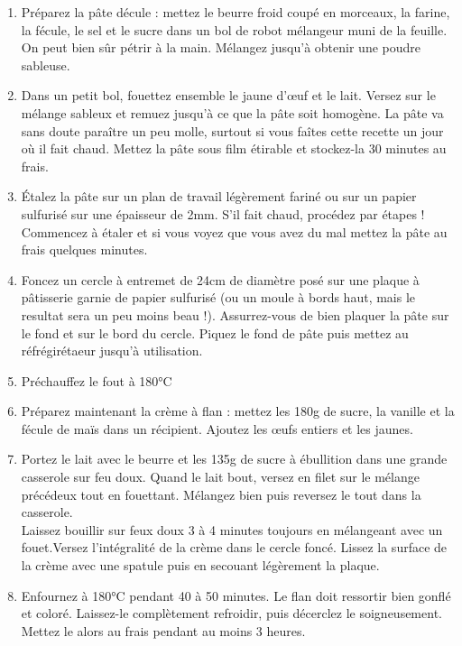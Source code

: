 {\begin{enumerate}
\item Préparez la pâte décule : mettez le beurre froid coupé en morceaux, la farine, la fécule, le sel et le sucre dans un bol de robot mélangeur muni de la feuille. On peut bien sûr pétrir à la main. Mélangez jusqu'à obtenir une poudre sableuse.
\item Dans un petit bol, fouettez ensemble le jaune d'\oe uf et le lait. Versez sur le mélange sableux et remuez jusqu'à ce que la pâte soit homogène. La pâte va sans doute paraître un peu molle, surtout si vous faîtes cette recette un jour où il fait chaud. Mettez la pâte sous film étirable et stockez-la 30 minutes au frais.
\item Étalez la pâte sur un plan de travail légèrement fariné ou sur un papier sulfurisé sur une épaisseur de 2mm. S'il fait chaud, procédez par étapes ! Commencez à étaler et si vous voyez que vous avez du mal mettez la pâte au frais quelques minutes.
\item Foncez un cercle à entremet de 24cm de diamètre posé sur une plaque à pâtisserie garnie de papier sulfurisé (ou un moule à bords haut, mais le resultat sera un peu moins beau !). Assurrez-vous de bien plaquer la pâte sur le fond et sur le bord du cercle. Piquez le fond de pâte puis mettez au réfrégirétaeur jusqu'à utilisation.
\item Préchauffez le fout à 180°C
\item Préparez maintenant la crème à flan : mettez les 180g de sucre, la vanille et la fécule de maïs dans un récipient. Ajoutez les \oe ufs entiers et les jaunes. 
\item Portez le lait avec le beurre et les 135g de sucre à ébullition dans une grande casserole sur feu doux. Quand le lait bout, versez en filet sur le mélange précédeux tout en fouettant. Mélangez bien puis reversez le tout dans la casserole.
\\ Laissez bouillir sur feux doux 3 à 4 minutes toujours en mélangeant avec un fouet.Versez l'intégralité de la crème dans le cercle foncé. Lissez la surface de la crème avec une spatule puis en secouant légèrement la plaque.
\item Enfournez à 180°C pendant 40 à 50 minutes. Le flan doit ressortir bien gonflé et coloré. Laissez-le complètement refroidir, puis décerclez le soigneusement. Mettez le alors au frais pendant au moins 3 heures.
\end{enumerate}}

